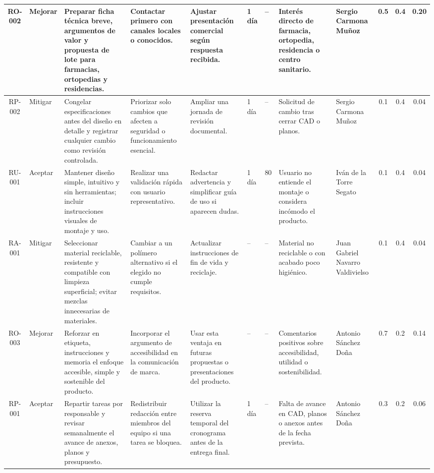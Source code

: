 \documentclass[11pt,a4paper]{article}
\begin{document}
\begin{table}[H]
{\begin{tabular}{|c|p{2.1cm}|p{4.2cm}|p{3.2cm}|p{3.3cm}|p{1.1cm}|p{1.1cm}|p{2.6cm}|p{2.8cm}|c|c|c|}
\hline
RO-002 & Mejorar & Preparar ficha técnica breve, argumentos de valor y propuesta de lote para farmacias, ortopedias y residencias. & Contactar primero con canales locales o conocidos. & Ajustar presentación comercial según respuesta recibida. & 1 día & -- & Interés directo de farmacia, ortopedia, residencia o centro sanitario. & Sergio Carmona Muñoz & 0.5 & 0.4 & \cellcolor{ArthroTeal!35}0.20 \\
\hline
RP-002 & Mitigar & Congelar especificaciones antes del diseño en detalle y registrar cualquier cambio como revisión controlada. & Priorizar solo cambios que afecten a seguridad o funcionamiento esencial. & Ampliar una jornada de revisión documental. & 1 día & -- & Solicitud de cambio tras cerrar CAD o planos. & Sergio Carmona Muñoz & 0.1 & 0.4 & \cellcolor{green!35}0.04 \\
\hline
RU-001 & Aceptar & Mantener diseño simple, intuitivo y sin herramientas; incluir instrucciones visuales de montaje y uso. & Realizar una validación rápida con usuario representativo. & Redactar advertencia y simplificar guía de uso si aparecen dudas. & 1 día & 80 & Usuario no entiende el montaje o considera incómodo el producto. & Iván de la Torre Segato & 0.1 & 0.4 & \cellcolor{green!35}0.04 \\
\hline
RA-001 & Mitigar & Seleccionar material reciclable, resistente y compatible con limpieza superficial; evitar mezclas innecesarias de materiales. & Cambiar a un polímero alternativo si el elegido no cumple requisitos. & Actualizar instrucciones de fin de vida y reciclaje. & -- & -- & Material no reciclable o con acabado poco higiénico. & Juan Gabriel Navarro Valdivielso & 0.1 & 0.4 & \cellcolor{green!35}0.04 \\
\hline
RO-003 & Mejorar & Reforzar en etiqueta, instrucciones y memoria el enfoque accesible, simple y sostenible del producto. & Incorporar el argumento de accesibilidad en la comunicación de marca. & Usar esta ventaja en futuras propuestas o presentaciones del producto. & -- & -- & Comentarios positivos sobre accesibilidad, utilidad o sostenibilidad. & Antonio Sánchez Doña & 0.7 & 0.2 & \cellcolor{ArthroTeal!35}0.14 \\
\hline
RP-001 & Aceptar & Repartir tareas por responsable y revisar semanalmente el avance de anexos, planos y presupuesto. & Redistribuir redacción entre miembros del equipo si una tarea se bloquea. & Utilizar la reserva temporal del cronograma antes de la entrega final. & 1 día & -- & Falta de avance en CAD, planos o anexos antes de la fecha prevista. & Antonio Sánchez Doña & 0.3 & 0.2 & \cellcolor{yellow!55}0.06 \\
\hline
\end{tabular}
}
\end{table}
\end{document}
